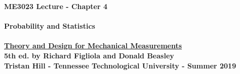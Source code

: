 \documentclass[11pt]{article}
\newcommand{\NUM}{4}
\begin{document}
\textbf{ \LARGE ME3023 Lecture -  Chapter \NUM \\\\ \hspace*{5mm} Probability and Statistics} \\\\
\textbf{ \hspace*{5mm}\underline{Theory and Design for Mechanical Measurements}\vspace{1mm}\\ 
                \hspace*{5mm} 5th ed. by Richard Figliola and Donald Beasley}\vspace{3mm}\\
\textbf{ \hspace*{5mm}Tristan Hill - Tennessee Technological University - Summer 2019} \vspace{3mm}\\
\end{document}
